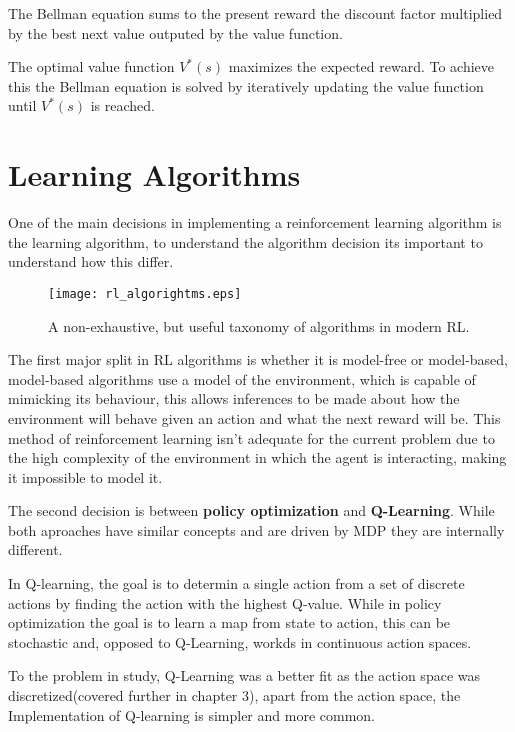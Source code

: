        The Bellman equation sums to the present reward the discount factor multiplied by the best next value outputed by the value function.

       The optimal value function $V^*(s)$ maximizes the expected reward. To achieve this the Bellman equation is solved by iteratively updating the value function until $V^*(s)$ is reached.


\section{Learning Algorithms}
One of the main decisions in implementing a reinforcement learning algorithm is the learning algorithm, to understand the algorithm decision its important to understand how this differ.
\begin{figure}[h]
\centering
\texttt{[image: rl\_algorightms.eps]}
\caption{A non-exhaustive, but useful taxonomy of algorithms in modern RL. \cite{openai_rl}}
\end{figure}

The first major split in RL algorithms is whether it is model-free or model-based, model-based algorithms use a model of the environment, which is capable of mimicking its behaviour, this allows inferences to be made about how the environment will behave given an action and what the next reward will be. This method of reinforcement learning isn't adequate for the current problem due to the high complexity of the environment in which the agent is interacting, making it impossible to model it.

The second decision is between \textbf{policy optimization} and \textbf{Q-Learning}. 
While both aproaches have similar concepts and are driven by MDP they are internally different. 

In Q-learning, the goal is to determin a single action from a set of discrete actions by finding the action with the highest Q-value. While in policy optimization the goal is to learn a map from state to action, this can be stochastic and, opposed to Q-Learning, workds in continuous action spaces.

To the problem in study, Q-Learning was a better fit as the action space was discretized(covered further in chapter 3), apart from the action space, the Implementation of Q-learning is simpler and more common.

